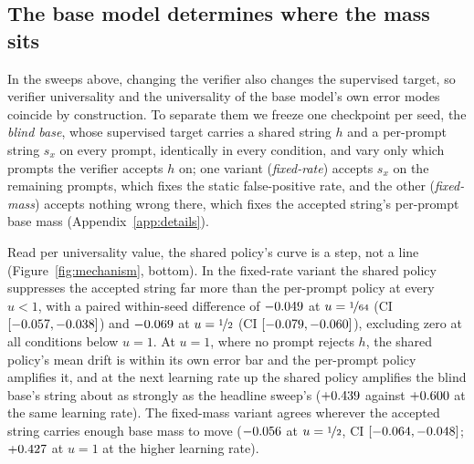 \documentclass{article}
\theoremstyle{definition}
\begin{document}
\subsection{The base model determines where the mass sits}
\label{sec:controls}

In the sweeps above, changing the verifier also changes the supervised target, so verifier universality and the universality of the base model's own error modes coincide by construction. To separate them we freeze one checkpoint per seed, the \emph{blind base}, whose supervised target carries a shared string $h$ and a per-prompt string $s_x$ on every prompt, identically in every condition, and vary only which prompts the verifier accepts $h$ on; one variant (\emph{fixed-rate}) accepts $s_x$ on the remaining prompts, which fixes the static false-positive rate, and the other (\emph{fixed-mass}) accepts nothing wrong there, which fixes the accepted string's per-prompt base mass (Appendix~\ref{app:details}).

Read per universality value, the shared policy's curve is a step, not a line (Figure~\ref{fig:mechanism}, bottom). In the fixed-rate variant the shared policy suppresses the accepted string far more than the per-prompt policy at every $u<1$, with a paired within-seed difference of $-0.049{}$ at $u=\nicefrac{1}{64}$ (CI $[-0.057, -0.038]{}$) and $-0.069{}$ at $u=\nicefrac12$ (CI $[-0.079, -0.060]{}$), excluding zero at all \MaskFprNBelowOne{} conditions below $u=1$. At $u=1$, where no prompt rejects $h$, the shared policy's mean drift is within its own error bar and the per-prompt policy amplifies it, and at the next learning rate up the shared policy amplifies the blind base's string about as strongly as the headline sweep's ($+0.439{}$ against $+0.600{}$ at the same learning rate). The fixed-mass variant agrees wherever the accepted string carries enough base mass to move ($-0.056{}$ at $u=\nicefrac12$, CI $[-0.064, -0.048]{}$; $+0.427{}$ at $u=1$ at the higher learning rate).
\end{document}
